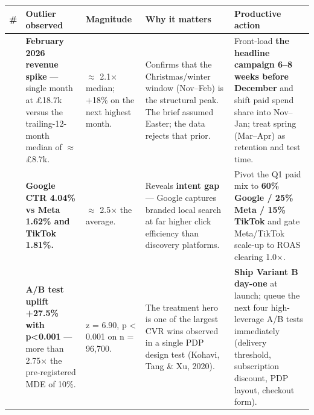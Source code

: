 \documentclass[
  11pt,
]{article}
\begin{document}
\begin{longtable}[]{@{}
  >{\raggedright\arraybackslash}p{}
  >{\raggedright\arraybackslash}p{}
  >{\raggedright\arraybackslash}p{}
  >{\raggedright\arraybackslash}p{}
  >{\raggedright\arraybackslash}p{}@{}}
\toprule\noalign{}
\begin{minipage}[b]{\linewidth}\raggedright
\#
\end{minipage} & \begin{minipage}[b]{\linewidth}\raggedright
Outlier observed
\end{minipage} & \begin{minipage}[b]{\linewidth}\raggedright
Magnitude
\end{minipage} & \begin{minipage}[b]{\linewidth}\raggedright
Why it matters
\end{minipage} & \begin{minipage}[b]{\linewidth}\raggedright
Productive action
\end{minipage} \\
\midrule\noalign{}
\endhead
\bottomrule\noalign{}
\endlastfoot
1 & \textbf{February 2026 revenue spike} --- single month at £18.7k
versus the trailing-12-month median of \(\approx\) £8.7k. & \(\approx\)
2.1\(\times\) median; +18\% on the next highest month. & Confirms that
the Christmas/winter window (Nov--Feb) is the structural peak. The brief
assumed Easter; the data rejects that prior. & Front-load \textbf{the
headline campaign 6--8 weeks before December} and shift paid spend share
into Nov--Jan; treat spring (Mar--Apr) as retention and test time. \\
2 & \textbf{Google CTR 4.04\% vs Meta 1.62\% and TikTok 1.81\%.} &
\(\approx\) 2.5\(\times\) the average. & Reveals \textbf{intent gap} ---
Google captures branded local search at far higher click efficiency than
discovery platforms. & Pivot the Q1 paid mix to \textbf{60\% Google /
25\% Meta / 15\% TikTok} and gate Meta/TikTok scale-up to ROAS clearing
1.0\(\times\). \\
3 & \textbf{A/B test uplift +27.5\% with p\textless0.001} --- more than
2.75\(\times\) the pre-registered MDE of 10\%. & z = 6.90, p \textless{}
0.001 on n = 96,700. & The treatment hero is one of the largest CVR wins
observed in a single PDP design test (Kohavi, Tang \& Xu, 2020). &
\textbf{Ship Variant B day-one} at launch; queue the next four
high-leverage A/B tests immediately (delivery threshold, subscription
discount, PDP layout, checkout form). \\
\end{longtable}
\end{document}

